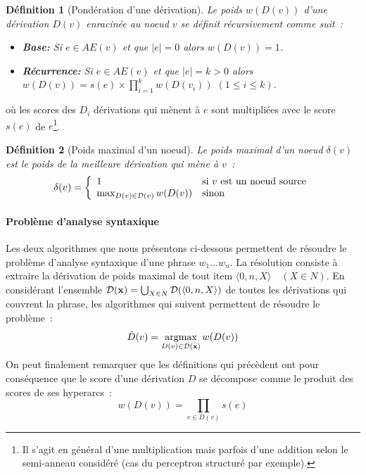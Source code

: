 \documentclass[11pt,openany]{book}
\newtheorem{definition}{Définition}[chapter]
\begin{document}
\begin{definition}[Pondération d'une dérivation]
Le poids $w(D(v))$ d'une dérivation $D(v)$ enracinée au noeud $v$ se définit récursivement comme suit~: 
\begin{itemize}
\item {\bf Base:} Si $e \in AE(v)$ et que $|e| = 0$ alors $w(D(v))  = 1$. 
\item {\bf Récurrence:} Si $e \in AE(v)$ et que $|e| = k > 0$ alors
  $w(D(v)) =  s(e) \times \prod_{i=1}^k w(D(v_i))$ $(1\leq i \leq k)$.
\end{itemize}
\end{definition}
où les scores des $D_i$ dérivations qui mènent à $e$ sont multipliées
avec le score $s(e)$ de $e$\footnote{Il s'agit en général d'une multiplication mais parfois d'une addition
selon le semi-anneau considéré (cas du perceptron structuré par exemple).}.

\begin{definition}[Poids maximal d'un noeud]
Le poids maximal d'un noeud $\delta(v)$ est le poids de la meilleure dérivation qui mène à $v$~:
\begin{displaymath}
\delta(v) = 
\left\{
\begin{array}{ll}
1 & \text{si $v$ est un noeud source}\\
\mathop{\text{max}}_{D(v) \in {\cal D}(v)} w(D(v))&\text{sinon}
\end{array}\right.
\end{displaymath}
\end{definition}


\paragraph{Problème d'analyse syntaxique} 
Les deux algorithmes que nous présentons ci-dessous permettent de
résoudre le problème d'analyse syntaxique d'une phrase $w_1\ldots w_n$.
La résolution consiste à extraire la dérivation de poids maximal de tout item $\langle 0,n , X \rangle \quad (X\in N)$.
En considérant l'ensemble ${\cal D}(\mathbf{x}) = \bigcup_{X \in N} {\cal D} (\langle 0, n, X \rangle) $ de toutes les dérivations qui couvrent la phrase,
les algorithmes qui suivent permettent de résoudre le problème~:
\begin{equation}
\hat{D}(v) = \mathop{\text{argmax}}_{D(v) \in {\cal D}(\mathbf{x})} w(D(v))
\end{equation}
On peut finalement remarquer que les définitions qui précèdent 
ont pour conséquence que le score d'une dérivation $D$ se décompose comme le produit des scores de ses hyperarcs~:
\begin{equation}
w(D(v)) = \prod_{e\in D(v)} s(e) 
\end{equation}
\end{document}
